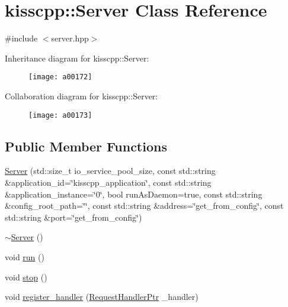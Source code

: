\hypertarget{a00040}{\section{kisscpp\-:\-:Server Class Reference}
\label{a00040}
}


{\ttfamily \#include $<$server.\-hpp$>$}



Inheritance diagram for kisscpp\-:\-:Server\-:\nopagebreak
\begin{figure}[H]
\begin{center}
\leavevmode
\texttt{[image: a00172]}
\end{center}
\end{figure}


Collaboration diagram for kisscpp\-:\-:Server\-:\nopagebreak
\begin{figure}[H]
\begin{center}
\leavevmode
\texttt{[image: a00173]}
\end{center}
\end{figure}
\subsection*{Public Member Functions}
\begin{DoxyCompactItemize}
\item 
\hyperlink{a00040_a5fcf3e975ad87cd0eda846f737615acd}{Server} (std\-::size\-\_\-t io\-\_\-service\-\_\-pool\-\_\-size, const std\-::string \&application\-\_\-id=\char`\"{}kisscpp\-\_\-application\char`\"{}, const std\-::string \&application\-\_\-instance=\char`\"{}0\char`\"{}, bool run\-As\-Daemon=true, const std\-::string \&config\-\_\-root\-\_\-path=\char`\"{}\char`\"{}, const std\-::string \&address=\char`\"{}get\-\_\-from\-\_\-config\char`\"{}, const std\-::string \&port=\char`\"{}get\-\_\-from\-\_\-config\char`\"{})
\item 
\hyperlink{a00040_acb8a45f705aaecf829a63f8f9254acb6}{$\sim$\-Server} ()
\item 
void \hyperlink{a00040_aa41d65074f051e5f5481671cd18d0435}{run} ()
\item 
void \hyperlink{a00040_aba167cdf551f3b29937c923ad7d18964}{stop} ()
\item 
void \hyperlink{a00040_a2f2e5671ce5e38610966fb6011d9fef9}{register\-\_\-handler} (\hyperlink{a00089_a21e40edcd4f1a3c7c1cc0015b576c8e5}{Request\-Handler\-Ptr} \-\_\-handler)
\end{DoxyCompactItemize}


